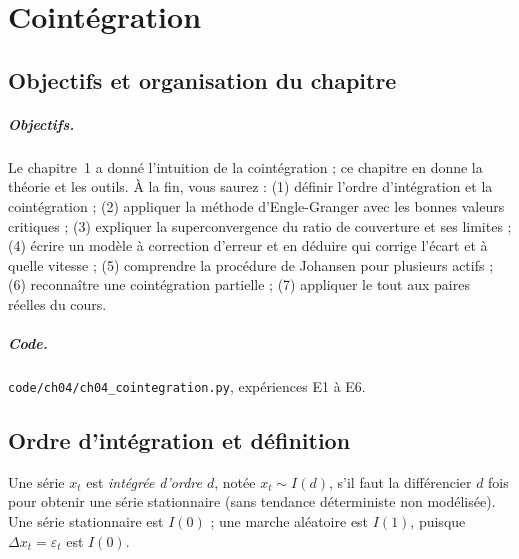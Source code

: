 \chapter{Cointégration}
\label{ch:4}

\section{Objectifs et organisation du chapitre}

\paragraph{Objectifs.} Le chapitre~1 a donné l'intuition de la cointégration ; ce chapitre en donne la théorie et les outils. À la fin, vous saurez : (1) définir l'ordre d'intégration et la cointégration ; (2) appliquer la méthode d'Engle-Granger avec les bonnes valeurs critiques ; (3) expliquer la superconvergence du ratio de couverture et ses limites ; (4) écrire un modèle à correction d'erreur et en déduire qui \og corrige\fg{} l'écart et à quelle vitesse ; (5) comprendre la procédure de Johansen pour plusieurs actifs ; (6) reconnaître une cointégration partielle ; (7) appliquer le tout aux paires réelles du cours.

\paragraph{Code.} \texttt{code/ch04/ch04\_cointegration.py}, expériences E1 à E6.

\section{Ordre d'intégration et définition}

\begin{definition}
Une série $x_t$ est \emph{intégrée d'ordre $d$}, notée $x_t\sim I(d)$, s'il faut la différencier $d$ fois pour obtenir une série stationnaire (sans tendance déterministe non modélisée). Une série stationnaire est $I(0)$ ; une marche aléatoire est $I(1)$, puisque $\Delta x_t = \varepsilon_t$ est $I(0)$.
\end{definition}

